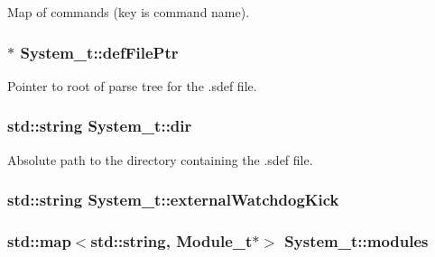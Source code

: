 Map of commands (key is command name). 

\subsubsection[{\texorpdfstring{def\+File\+Ptr}{defFilePtr}}]{$\ast$ System\+\_\+t\+::def\+File\+Ptr}\hypertarget{struct_system__t_aeb7f438e21368b4ab7ca857ed81fe59a}{}\label{struct_system__t_aeb7f438e21368b4ab7ca857ed81fe59a}


Pointer to root of parse tree for the .sdef file. 

\subsubsection[{\texorpdfstring{dir}{dir}}]{\setlength{\rightskip}{0pt plus 5cm}std\+::string System\+\_\+t\+::dir}\hypertarget{struct_system__t_afcf491aa7a2efa92f5aeac4e33bad59a}{}\label{struct_system__t_afcf491aa7a2efa92f5aeac4e33bad59a}


Absolute path to the directory containing the .sdef file. 

\subsubsection[{\texorpdfstring{external\+Watchdog\+Kick}{externalWatchdogKick}}]{\setlength{\rightskip}{0pt plus 5cm}std\+::string System\+\_\+t\+::external\+Watchdog\+Kick}\hypertarget{struct_system__t_a64100bed48bb1e5874feb2db7c2db1a8}{}\label{struct_system__t_a64100bed48bb1e5874feb2db7c2db1a8}
\subsubsection[{\texorpdfstring{modules}{modules}}]{\setlength{\rightskip}{0pt plus 5cm}std\+::map$<$std\+::string, {\bf Module\+\_\+t}$\ast$$>$ System\+\_\+t\+::modules}\hypertarget{struct_system__t_af643d722d60da7a06849ec6a7c0bd918}{}\label{struct_system__t_af643d722d60da7a06849ec6a7c0bd918}


